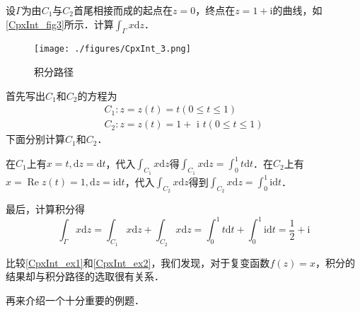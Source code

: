 \begin{example}{} \label{CpxInt_ex2}
设$Γ$为由$C_1$与$C_2$首尾相接而成的起点在$z=0$，终点在$ z =1+ \mathrm i $的曲线，如\autoref{CpxInt_fig3}所示．计算$\displaystyle \int_{\Gamma} x \mathrm{d}z$．
\begin{figure}[ht]
\centering
\texttt{[image: ./figures/CpxInt\_3.png]}
\caption{积分路径} \label{CpxInt_fig3}
\end{figure}

首先写出$C_1$和$C_2$的方程为
\begin{equation}
\begin{array}{l}C_{1}: z=z(t)=t(0 \leqslant t \leqslant 1) \\ C_{2}: z=z(t)=1+\text { i }t(0 \leqslant t \leqslant 1)\end{array}
\end{equation}
下面分别计算$C_1$和$C_2$．

在$C_1$上有$x=t, \mathrm{d} z=\mathrm{d} t$，代入$\displaystyle \int_{C_{1}} x \mathrm{d} z$得$\displaystyle \int_{C_{1}} x \mathrm{d} z=\int_{0}^{1} t \mathrm{d} t$．在$C_2$上有$\displaystyle x=\operatorname{Re} z(t)=1, \mathrm{d} z=\mathrm{id} t$，代入$\displaystyle \int_{C_{2}} x \mathrm{d} z$得到$\displaystyle \int_{C_{2}} x \mathrm{d} z=\int_{0}^{1} \mathrm{id} t$．

最后，计算积分得
\begin{equation}
\int_{\Gamma} x \mathrm{d} z=\int_{C_{1}} x \mathrm{d} z+\int_{C_{2}} x \mathrm{d} z=\int_{0}^{1} t \mathrm{d} t+\int_{0}^{1} \mathrm{i} \mathrm{d} t=\frac{1}{2}+\mathrm{i}
\end{equation}
\end{example}

比较\autoref{CpxInt_ex1}和\autoref{CpxInt_ex2}，我们发现，对于复变函数$f(z)=x$，积分的结果却与积分路径的选取很有关系．

再来介绍一个十分重要的例题．

